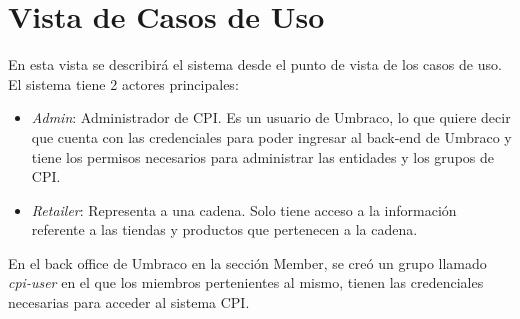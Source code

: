 \vskip 2cm
    \section{Vista de Casos de Uso} \label{vistaCasosDeUso}
    En esta vista se describirá el sistema desde el punto de vista de los casos de uso. El sistema tiene 2 actores principales:

    \begin{itemize}
        \item \emph{Admin}: Administrador de CPI. Es un usuario de Umbraco, lo que quiere decir que cuenta con las credenciales para poder ingresar al back-end de Umbraco y tiene los permisos necesarios para administrar las entidades y los grupos de CPI.
        \item \emph{Retailer}: Representa a una cadena. Solo tiene acceso a la información referente a las tiendas y productos que pertenecen a la cadena.
    \end{itemize}
    En el back office de Umbraco en la sección Member, se creó un grupo llamado \emph{cpi-user} en el que los miembros pertenientes al mismo, tienen las credenciales necesarias para acceder al sistema CPI.
    
\pagebreak
